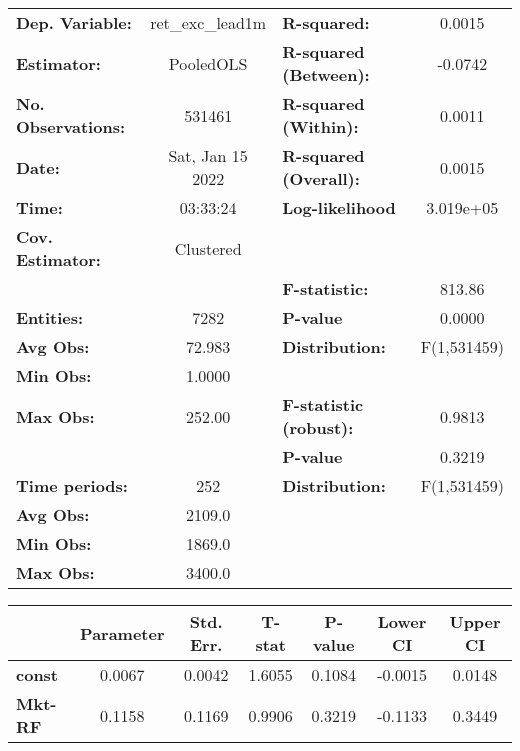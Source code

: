 \begin{center}
\begin{tabular}{lclc}
\toprule
\textbf{Dep. Variable:}    &  ret\_exc\_lead1m  & \textbf{  R-squared:         }   &      0.0015      \\
\textbf{Estimator:}        &     PooledOLS      & \textbf{  R-squared (Between):}  &     -0.0742      \\
\textbf{No. Observations:} &       531461       & \textbf{  R-squared (Within):}   &      0.0011      \\
\textbf{Date:}             &  Sat, Jan 15 2022  & \textbf{  R-squared (Overall):}  &      0.0015      \\
\textbf{Time:}             &      03:33:24      & \textbf{  Log-likelihood     }   &    3.019e+05     \\
\textbf{Cov. Estimator:}   &     Clustered      & \textbf{                     }   &                  \\
\textbf{}                  &                    & \textbf{  F-statistic:       }   &      813.86      \\
\textbf{Entities:}         &        7282        & \textbf{  P-value            }   &      0.0000      \\
\textbf{Avg Obs:}          &       72.983       & \textbf{  Distribution:      }   &   F(1,531459)    \\
\textbf{Min Obs:}          &       1.0000       & \textbf{                     }   &                  \\
\textbf{Max Obs:}          &       252.00       & \textbf{  F-statistic (robust):} &      0.9813      \\
\textbf{}                  &                    & \textbf{  P-value            }   &      0.3219      \\
\textbf{Time periods:}     &        252         & \textbf{  Distribution:      }   &   F(1,531459)    \\
\textbf{Avg Obs:}          &       2109.0       & \textbf{                     }   &                  \\
\textbf{Min Obs:}          &       1869.0       & \textbf{                     }   &                  \\
\textbf{Max Obs:}          &       3400.0       & \textbf{                     }   &                  \\
\bottomrule
\end{tabular}
\begin{tabular}{lcccccc}
                & \textbf{Parameter} & \textbf{Std. Err.} & \textbf{T-stat} & \textbf{P-value} & \textbf{Lower CI} & \textbf{Upper CI}  \\
\midrule
\textbf{const}  &       0.0067       &       0.0042       &      1.6055     &      0.1084      &      -0.0015      &       0.0148       \\
\textbf{Mkt-RF} &       0.1158       &       0.1169       &      0.9906     &      0.3219      &      -0.1133      &       0.3449       \\
\bottomrule
\end{tabular}
\end{center}
